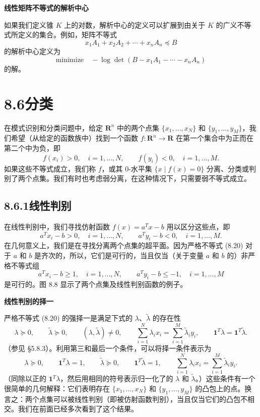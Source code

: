 \documentclass[UTF8,12pt,a4paper,fontset=fandol]{ctexart}
\begin{document}
\noindent\textbf{线性矩阵不等式的解析中心}

如果我们定义锥 $K$ 上的对数，解析中心的定义可以扩展到由关于 $K$ 的广义不等式所定义的集合。例如，矩阵不等式
\[
x_1A_1+x_2A_2+\cdots+x_nA_n\preceq B
\]
的解析中心定义为
\[
\mbox{minimize}\quad -\log\det(B-x_1A_1-\cdots-x_nA_n)
\]
的解。

\section*{8.6\quad 分类}

在模式识别和分类问题中，给定 $\mathbf{R}^n$ 中的两个点集 $\{x_1,\ldots,x_N\}$ 和 $\{y_1,\ldots,y_M\}$，我们希望（从给定的函数族中）找到一个函数 $f:\mathbf{R}^n\to\mathbf{R}$ 在第一个集合中为正而在第二个中为负，即
\[
f(x_i)>0,\quad i=1,\ldots,N,\qquad f(y_i)<0,\quad i=1,\ldots,M.
\]
如果这些不等式成立，我们称 $f$，或其 0-水平集 $\{x\mid f(x)=0\}$ 分离、分类或判别了两个点集。我们有时也考虑弱分离，在这种情况下，只需要弱不等式成立。

\subsection*{8.6.1\quad 线性判别}

在线性判别中，我们寻找仿射函数 $f(x)=a^Tx-b$ 用以区分这些点，即
\[
a^Tx_i-b>0,\quad i=1,\ldots,N,\qquad a^Ty_i-b<0,\quad i=1,\ldots,M.
\tag{8.20}
\]
在几何意义上，我们是在寻找分离两个点集的超平面。因为严格不等式 (8.20) 对于 $a$ 和 $b$ 是齐次的，所以，它们是可行的，当且仅当（关于变量 $a$ 和 $b$ 的）非严格不等式组
\[
a^Tx_i-b\geq 1,\quad i=1,\ldots,N,\qquad a^Ty_i-b\leq -1,\quad i=1,\ldots,M
\tag{8.21}
\]
是可行的。图 8.8 显示了两个点集及线性判别函数的例子。

\noindent\textbf{线性判别的择一}

严格不等式 (8.20) 的强择一是满足下式的 $\lambda$、$\tilde\lambda$ 的存在性
\[
\lambda\succeq 0,\qquad \tilde\lambda\succeq 0,\qquad
(\lambda,\tilde\lambda)\neq 0,\qquad
\sum_{i=1}^N \lambda_i x_i=\sum_{i=1}^M \tilde\lambda_i y_i,\qquad
\mathbf{1}^T\lambda=\mathbf{1}^T\tilde\lambda.
\tag{8.22}
\]
（参见 \S 5.8.3）。利用第三和最后一个条件，可以将择一条件表示为
\[
\lambda\succeq 0,\qquad \mathbf{1}^T\lambda=1,\qquad
\tilde\lambda\succeq 0,\qquad \mathbf{1}^T\tilde\lambda=1,\qquad
\sum_{i=1}^N \lambda_i x_i=\sum_{i=1}^M \tilde\lambda_i y_i.
\]
（同除以正的 $\mathbf{1}^T\lambda$，然后用相同的符号表示归一化了的 $\lambda$ 和 $\tilde\lambda$。）这些条件有一个很简单的几何解释：它们表明存在 $\{x_1,\ldots,x_N\}$ 和 $\{y_1,\ldots,y_M\}$ 的凸包上的点。换言之：两个点集可以被线性判别（即被仿射函数判别），当且仅当它们的凸包不相交。我们在前面已经多次看到了这个结果。
\end{document}
